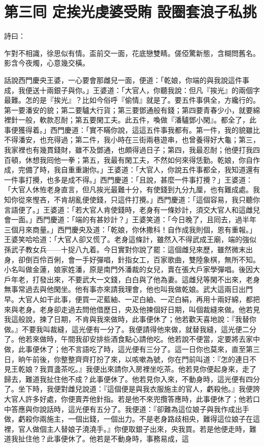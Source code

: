 
\chapter*{第三囘 定挨光虔婆受賄 設圈套浪子私挑}


詩曰：

乍對不相識，徐思似有情。盃前交一面，花底戀雙睛。傞俹驚新態，含糊問舊名。影含今夜燭，心意幾交橫。

話說西門慶央王婆，一心要會那雌兒一面，便道：「乾娘，你端的與我說這件事成，我便送十兩銀子與你。」王婆道：「大官人，你聽我說：但凡『挨光』的兩個字最難。怎的是『挨光』？比如今俗呼『偷情』就是了。要五件事俱全，方纔行的。第一要潘安的貌；第二要驢大行貨；第三要鄧通般有錢；第四要青春少小，就要綿裡針一般，軟款忍耐；第五要閑工夫。此五件，喚做『潘驢鄧小閑』。都全了，此事便獲得着。」西門慶道：「實不瞞你說，這這五件事我都有。第一件，我的貌雖比不得潘安，也充得過；第二件，我小時在三街兩巷遊串，也曾養得好大龜；第三，我家裡也有幾貫錢財，雖不及鄧通，也頗得過日子；第四，我最忍耐；他便打我四百頓，休想我囘他一拳；第五，我最有閑工夫，不然如何來得恁勤。乾娘，你自作成，完備了時，我自重重謝你。」王婆道：「大官人，你說五件事都全，我知道還有一件事打攪，也多是成不得。」西門慶道：「且說，甚麼一件事打攪？」王婆道：「大官人休恠老身直言，但凡挨光最難十分，有使錢到九分九厘，也有難成處。我知你從來慳吝，不肯胡亂便使錢，只這件打攪。」西門慶道：「這個容易，我只聽你言語便了。」王婆道：「若大官人肯使錢時，老身有一條妙計，須交大官人和這雌兒會一面。」西門慶道：「端的有甚妙計？」王婆笑道：「今日晚了，且囘去，過半年三個月來商量。」西門慶央及道：「乾娘，你休撒科！自作成我則個，恩有重報。」王婆笑哈哈道：「大官人卻又慌了。老身這條計，雖然入不得武成王廟，端的強似孫武子教女兵——十捉八九着。今日實對你說了罷：這個雌兒來歷，雖然微末出身，卻倒百伶百俐，會一手好彈唱，針指女工，百家歌曲，雙陸象棋，無所不知。小名叫做金蓮，娘家姓潘，原是南門外潘裁的女兒，賣在張大戶家學彈唱。後因大戶年老，打發出來，不要武大一文錢，白白與了他為妻。這雌兒等閑不出來，老身無事常過去與他閑坐。他有事亦來請我理會，他也叫我做乾娘。武大這兩日出門早。大官人如干此事，便買一疋藍紬、一疋白紬、一疋白絹，再用十兩好綿，都把來與老身。老身卻走過去問他借歷日，央及他揀個好日期，叫個裁縫來做。他若見我這般說，揀了日期，不肯與我來做時，此事便休了；他若歡天喜地說：『我替你做。』不要我叫裁縫，這光便有一分了。{}我便請得他來做，就替我縫，這光便二分了。他若來做時，午間我卻安排些酒食點心請他吃。他若說不便當，定要將去家中做，此事便休了；他不言語吃了時，這光便有三分了。這一日你也莫來，直至第三日，晌午前後，你整整齊齊打扮了來，以咳嗽為號，你在門前叫道：『怎的連日不見王乾娘？我買盞茶吃。』我便出來請你入房裡坐吃茶。他若見你便起身來，走了歸去，難道我扯住他不成？此事便休了。他若見你入來，不動身時，這光便有四分了。坐下時，我便對雌兒說道：『這個便是與我衣服施主的官人，虧殺他。』我便誇大官人許多好處，你便賣弄他針指。若是他不來兜攬答應時，此事便休了；他若口中答應與你說話時，這光便有五分了。我便道：『卻難為這位娘子與我作成出手做，虧殺你兩施主，一個出錢，一個出力。不是老身路歧相央，難得這位娘子在這裡，官人做個主人替娘子澆澆手。』你便取銀子出來，央我買。若是他便走時，難道我扯住他？此事便休了。他若是不動身時，事務易成，這